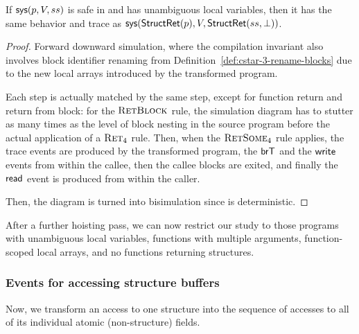 \begin{theorem}
  If $\text{\textsf{sys}}(p, V, ss)$ is safe in  and has unambiguous local
  variables, then it has the same behavior and trace as
  $\text{\textsf{sys}}(\text{\textsf{StructRet}}(p), V, \text{\textsf{StructRet}}(ss, \bot))$.
\end{theorem}
\begin{proof}
  Forward downward simulation, where the compilation invariant also
  involves block identifier renaming from
  Definition~\ref{def:cstar-3-rename-blocks} due to the new local
  arrays introduced by the transformed program.

  Each  step is actually matched by the same  step, except for
  function return and return from block: for the $\textsc{RetBlock}$
  rule, the simulation diagram has to stutter as many times as the
  level of block nesting in the source program before the actual
  application of a $\textsc{Ret}_4$ rule. Then, when the
  $\textsc{RetSome}_4$ rule applies, the trace events are produced by
  the transformed program, the $\text{\textsf{brT}}$ and the $\text{\textsf{write}}$ events from
  within the callee, then the callee blocks are exited, and finally
  the $\text{\textsf{read}}$ event is produced from within the caller.

  Then, the diagram is turned into bisimulation since  is
  deterministic.
\end{proof}

After a further hoisting pass, we can now restrict our study to those
 programs with unambiguous local variables, functions with multiple
arguments, function-scoped local arrays, and no functions returning
structures.

\subsubsection{Events for accessing structure buffers} \label{sec:struct-events}

Now, we transform an access to one structure into the
sequence of accesses to all of its individual atomic (non-structure)
fields.


